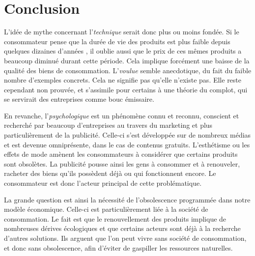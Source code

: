 \chapter*{Conclusion}

%
%
%
%
%

L'idée de mythe concernant l'\op \textit{technique} serait donc plus ou moins fondée. Si le consommateur pense que la durée de vie des produits est plus faible depuis quelques dizaines d'années , il oublie aussi que le prix de ces mêmes produits a beaucoup diminué durant cette période. Cela implique forcément une baisse de la qualité des biens de consommation. L'\op \textit{voulue} semble anecdotique, du fait du faible nombre d'exemples concrets. Cela ne signifie pas qu'elle n'existe pas. Elle reste cependant non prouvée, et s'assimile pour certains à une théorie du complot, qui se servirait des entreprises comme bouc émissaire. 

\bigbreak
En revanche, l'\op \textit{psychologique} est un phénomène connu et reconnu, conscient et recherché par beaucoup d'entreprises au travers du marketing et plus particulièrement de la publicité. Celle-ci s'est développée sur de nombreux médias et est devenue omniprésente, dans le cas de contenus gratuits. L'esthétisme ou les effets de mode amènent les consommateurs à considérer que certains produits sont obsolètes. La publicité pousse ainsi les gens à consommer et à renouveler, racheter des biens qu'ils possèdent déjà ou qui fonctionnent encore. Le consommateur est donc l’acteur principal de cette problématique.

\bigbreak
La grande question est ainsi la nécessité de l'obsolescence programmée dans notre modèle économique. Celle-ci est particulièrement liée à la société de consommation. Le fait est que le renouvellement des produits implique de nombreuses dérives écologiques et que certains acteurs sont déjà à la recherche d'autres solutions. Ils arguent que l'on peut vivre sans société de consommation, et donc sans obsolescence, afin d'éviter de gaspiller les ressources naturelles.